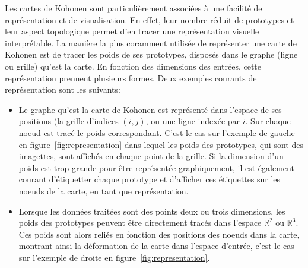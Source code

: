 Les cartes de Kohonen sont particulièrement associées à une facilité de représentation et de visualisation. En effet, leur nombre réduit de prototypes et leur aspect topologique permet d'en tracer une représentation visuelle interprétable.
La manière la plus coramment utilisée de représenter une carte de Kohonen est de tracer les poids de ses prototypes, disposés dans le graphe (ligne ou grille) qu'est la carte. En fonction des dimensions des entrées, cette représentation prennent plusieurs formes. Deux exemples courants de représentation sont les suivants: 
\begin{itemize}
\item Le graphe qu'est la carte de Kohonen est représenté dans l'espace de ses positions (la grille d'indices $(i,j)$, ou une ligne indexée par $i$. Sur chaque noeud est tracé le poids correspondant. C'est le cas sur l'exemple de gauche en figure~\ref{fig:representation} dans lequel les poids des prototypes, qui sont des imagettes, sont affichés en chaque point de la grille. Si la dimension d'un poids est trop grande pour être représentée graphiquement, il est également courant d'étiquetter chaque prototype et d'afficher ces étiquettes sur les noeuds de la carte, en tant que représentation.
\item Lorsque les données traitées sont des points deux ou trois dimensions, les poids des prototypes peuvent être directement tracés dans l'espace $\mathbb{R}^2$ ou $\mathbb{R}^3$. Ces poids sont alors reliés en fonction des positions des noeuds dans la carte, montrant ainsi la déformation de la carte dans l'espace d'entrée, c'est le cas sur l'exemple de droite en figure~\ref{fig:representation}.
\end{itemize}

